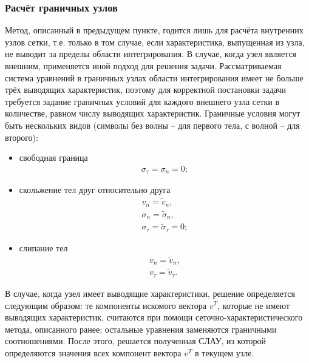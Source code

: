 \subsubsection{Расчёт граничных узлов}
Метод, описанный в предыдущем пункте, годится лишь для расчёта внутренних узлов
сетки, т.е. только в том случае, если характеристика, выпущенная из узла, не
выводит за пределы области интегрирования. В случае, когда узел является
внешним, применяется иной подход для решения задачи. Рассматриваемая система
уравнений в граничных узлах области интегрирования имеет не больше трёх
\cite{chelnokov} выводящих характеристик, поэтому для корректной постановки
задачи требуется задание граничных условий для каждого внешнего узла сетки в
количестве, равном числу выводящих характеристик. Граничные условия могут быть
нескольких видов (символы без волны -- для первого тела, с волной -- для второго):
\begin{itemize}
\item{свободная граница
\begin{eqnarray}
\sigma_\tau=\sigma_n=0; \nonumber
\end{eqnarray}}
\item{скольжение тел друг относительно друга 
\begin{eqnarray}
v_n=\tilde{v}_n,\nonumber\\
\sigma_n=\tilde{\sigma}_n,\nonumber\\
\sigma_\tau=\tilde{\sigma}_\tau=0; \nonumber
\end{eqnarray}}
\item{слипание тел
\begin{eqnarray}
v_n=\tilde{v}_n,\nonumber\\
v_\tau=\tilde{v}_\tau.
\end{eqnarray}}
\end{itemize}
В случае, когда узел имеет выводящие характеристики, решение определяется
следующим образом: те компоненты искомого вектора $v^T$, которые не имеют
выводящих характеристик, считаются при помощи сеточно-характеристического
метода, описанного ранее; остальные уравнения заменяются граничными
соотношениями. После этого, решается полученная СЛАУ, из которой определяются
значения всех компонент вектора $v^T$ в текущем узле.
